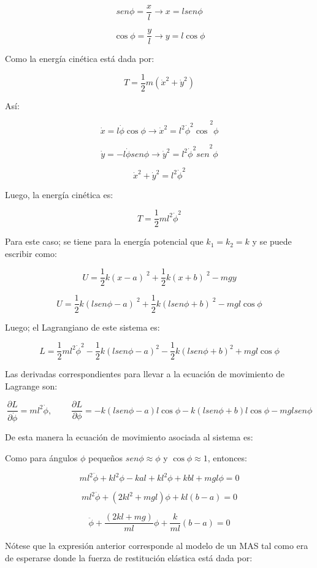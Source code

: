 \documentclass[]{article}
\begin{document}
\[{sen}\phi = \frac{x}{l} \rightarrow x = l{sen}\phi\]

\[\cos\phi = \frac{y}{l} \rightarrow y = l\cos\phi\]

Como la energía cinética está dada por:

\[T = \frac{1}{2}m\left( {\dot{x}}^{2} + {\dot{y}}^{2} \right)\]

Así:

\[\dot{x} = l\dot{\phi}\cos\phi \rightarrow {\dot{x}}^{2} = l^{2}{{\dot{\phi}}^{2}\cos}^{2}\phi\]

\[\dot{y} = - l\dot{\phi}{sen}\phi \rightarrow {\dot{y}}^{2} = l^{2}{{\dot{\phi}}^{2}sen}^{2}\phi\]

\[{\dot{x}}^{2} + {\dot{y}}^{2} = l^{2}{\dot{\phi}}^{2}\]

Luego, la energía cinética es:

\[T = \frac{1}{2}ml^{2}{\dot{\phi}}^{2}\]

Para este caso; se tiene para la energía potencial que
\(k_{1} = k_{2} = k\) y se puede escribir como:

\[U = \frac{1}{2}k{(x - a)\ }^{2} + \frac{1}{2}k{(x + b)\ }^{2} - mgy\]

\[U = \frac{1}{2}k{(l{sen}\phi - a)\ }^{2} + \frac{1}{2}k{(l{sen}\phi + b)\ }^{2} - mgl\cos\phi\]

Luego; el Lagrangiano de este sistema es:

\[L = \frac{1}{2}ml^{2}{\dot{\phi}}^{2} - \frac{1}{2}k\left( l{sen}\phi - a \right)^{2} - \frac{1}{2}k\left( l{sen}\phi + b \right)^{2} + mgl\cos\phi\]

Las derivadas correspondientes para llevar a la ecuación de movimiento
de Lagrange son:

\[\frac{\partial L}{\partial\dot{\phi}} = ml^{2}\dot{\phi},\ \ \ \ \ \ \ \ \ \ \frac{\partial L}{\partial\phi} = - k\left( l{sen}\phi - a \right)l\cos\phi - k\left( l{sen}\phi + b \right)l\cos\phi - mgl{sen}\phi\]

De esta manera la ecuación de movimiento asociada al sistema es:

Como para ángulos \(\phi\) pequeños \({sen}\phi \approx \phi\) y
\(\cos\phi \approx 1\), entonces:

\[ml^{2}\ddot{\phi} + kl^{2}\phi - kal + kl^{2}\phi + kbl + mgl\phi = 0\]

\[ml^{2}\ddot{\phi} + \left( 2kl^{2} + mgl \right)\phi + kl(b - a) = 0\]

\[\ddot{\phi} + \frac{(2kl + mg)}{ml}\phi + \frac{k}{ml}(b - a) = 0\]

Nótese que la expresión anterior corresponde al modelo de un MAS tal
como era de esperarse donde la fuerza de restitución elástica está dada
por:
\end{document}
